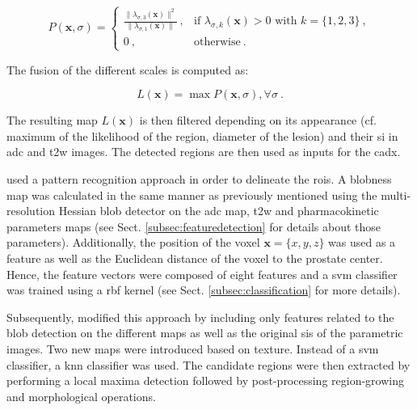 \begin{equation}
P(\mathbf{x},\sigma) = \begin{cases}
	\frac{\| \lambda_{\sigma,3}(\mathbf{x}) \|^{2}}{\| \lambda_{\sigma,1} (\mathbf{x}) \|} \ , & \text{if } \lambda_{\sigma,k}(\mathbf{x}) > 0 \text{ with } k = \{1,2,3\} \  , \\
	0 \ , & \text{otherwise} \ .
\end{cases}
\label{eq:blobdet}
\end{equation}

The fusion of the different scales is computed as:

\begin{equation}
	L(\mathbf{x}) = \max P(\mathbf{x},\sigma) , \forall \sigma \ .
	\label{eq:fusionBlob}
\end{equation}

The resulting map $L(\mathbf{x})$ is then filtered depending on its appearance (cf. maximum of the likelihood of the region, diameter of the lesion) and their \ac{si} in \ac{adc} and \ac{t2w} images. The detected regions are then used as inputs for the \ac{cadx}.

\cite{Litjens2011} used a pattern recognition approach in order to delineate the \acp{roi}. A blobness map was calculated in the same manner as previously mentioned using the multi-resolution Hessian blob detector on the \ac{adc} map, \ac{t2w} and pharmacokinetic parameters maps (see Sect. \ref{subsec:featuredetection} for details about those parameters). Additionally, the position of the voxel $\mathbf{x}=\{x,y,z\}$ was used as a feature as well as the Euclidean distance of the voxel to the prostate center. Hence, the feature vectors were composed of eight features and a \ac{svm} classifier was trained using a \ac{rbf} kernel (see Sect. \ref{subsec:classification} for more details).

Subsequently, \cite{Litjens2012} modified this approach by including only features related to the blob detection on the different maps as well as the original \acp{si} of the parametric images. Two new maps were introduced based on texture. Instead of a \ac{svm} classifier, a \ac{knn} classifier was used. The candidate regions were then extracted by performing a local maxima detection followed by post-processing region-growing and morphological operations. 